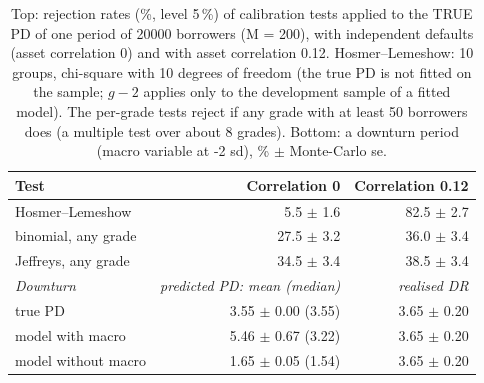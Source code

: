 \begin{table}[H]
\centering
\scriptsize
\caption{Top: rejection rates (\%, level 5\,\%) of calibration tests applied to the TRUE PD of one period of 20000 borrowers (M = 200), with independent defaults (asset correlation 0) and with asset correlation 0.12. Hosmer--Lemeshow: 10 groups, chi-square with 10 degrees of freedom (the true PD is not fitted on the sample; $g-2$ applies only to the development sample of a fitted model). The per-grade tests reject if any grade with at least 50 borrowers does (a multiple test over about 8 grades). Bottom: a downturn period (macro variable at -2 sd), \% $\pm$ Monte-Carlo se.}
\label{tab:C2_calibration}
\begin{tabular}{lrr}
\toprule
Test & Correlation 0 & Correlation 0.12 \\
\midrule
Hosmer--Lemeshow & 5.5 $\pm$ 1.6 & 82.5 $\pm$ 2.7 \\
binomial, any grade & 27.5 $\pm$ 3.2 & 36.0 $\pm$ 3.4 \\
Jeffreys, any grade & 34.5 $\pm$ 3.4 & 38.5 $\pm$ 3.4 \\
\midrule
\textit{Downturn} & \textit{predicted PD: mean (median)} & \textit{realised DR} \\
true PD & 3.55 $\pm$ 0.00 (3.55) & 3.65 $\pm$ 0.20 \\
model with macro & 5.46 $\pm$ 0.67 (3.22) & 3.65 $\pm$ 0.20 \\
model without macro & 1.65 $\pm$ 0.05 (1.54) & 3.65 $\pm$ 0.20 \\
\bottomrule
\end{tabular}
\end{table}
